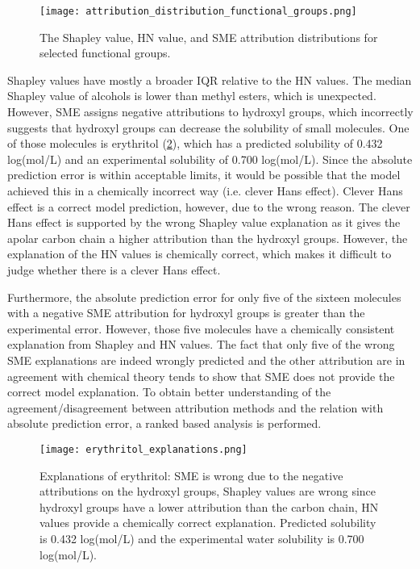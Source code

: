 \begin{figure}[h]
    \centering
    \texttt{[image: attribution\_distribution\_functional\_groups.png]}
    \caption{The Shapley value, HN value, and SME attribution distributions for selected functional groups.}
    \label{fig:attribution_distribution_fg}
\end{figure}


Shapley values have mostly a broader IQR relative to the HN values. The median 
Shapley value of alcohols is lower than methyl esters, which is unexpected. 
However, SME assigns negative attributions to hydroxyl groups, which incorrectly suggests 
that hydroxyl groups can decrease the solubility of small molecules. One of those 
molecules is erythritol (\cref{fig:erythritol_explanation}), which has a predicted solubility of 0.432 log(mol/L) 
and an experimental solubility of 0.700 log(mol/L). Since the absolute prediction 
error is within acceptable limits, it would be possible that the model achieved 
this in a chemically incorrect way (i.e. clever Hans effect\cite{lapuschkin2019unmasking}). 
Clever Hans effect is a correct model prediction, however, due to the wrong reason. 
The clever Hans effect is supported by the wrong Shapley value explanation as it gives the 
apolar carbon chain a higher attribution than the hydroxyl groups. However, 
the explanation of the HN values is chemically correct, which makes it difficult 
to judge whether there is a clever Hans effect. 

Furthermore, the absolute prediction 
error for only five of the sixteen molecules with a negative SME attribution for 
hydroxyl groups is greater than the experimental error. However, those five molecules 
have a chemically consistent explanation from Shapley and HN values. The fact that only 
five of the wrong SME explanations are indeed wrongly predicted and the other attribution 
are in agreement with chemical theory tends to show that SME does not provide the correct 
model explanation. To obtain better understanding of the agreement/disagreement between 
attribution methods and the relation with absolute prediction error, a ranked based analysis is performed. 


\begin{figure}[h]
    \centering
    \texttt{[image: erythritol\_explanations.png]}
    \caption{Explanations of erythritol: SME is wrong due to the negative attributions on the hydroxyl groups, 
    Shapley values are wrong since hydroxyl groups have a lower attribution than the carbon chain, HN values provide 
    a chemically correct explanation. Predicted solubility is 0.432 log(mol/L) and the experimental water solubility is 
    0.700 log(mol/L).}
    \label{fig:erythritol_explanation}
\end{figure}


